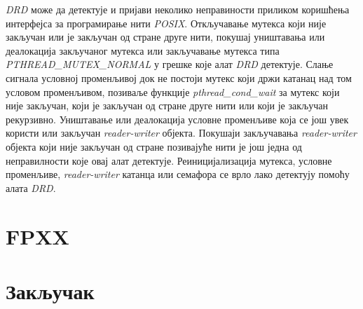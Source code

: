 \documentclass[12pt,oneside]{memoir}
\begin{document}
\indent \textit{DRD} може да детектује и пријави неколико неправиности приликом коришћења интерфејса за програмирање нити  \textit{POSIX}. Откључавање мутекса који није закључан или је закључан од стране друге нити, покушај уништавања или деалокација закључаног мутекса или закључавање мутекса типа  \textit{PTHREAD\_\-MUTEX\_NORMAL} у грешке које алат \textit{DRD} детектује. Слање сигнала условној променљивој док не постоји мутекс који држи катанац над том условом променљивом, позиваље функције \textit{pthread\_cond\_wait} за мутекс који није закључан, који је закључан од стране друге нити или који је закључан рекурзивно. Уништавање или деалокација условне променљиве која се још увек користи или закључан \textit{reader-writer} објекта. Покушаји закључавања \textit{reader-writer} објекта који није закључан од стране позивајуће нити је још једна од неправилности које овај алат детектује. Реиницијализација мутекса, условне променљиве, \textit{reader-writer} катанца или семафора се врло лако детектују помоћу алата \textit{DRD}.


\chapter{FPXX}
\label{chp:fpxx}

\chapter{Закључак}



\literatura

\backmatter
\end{document}
